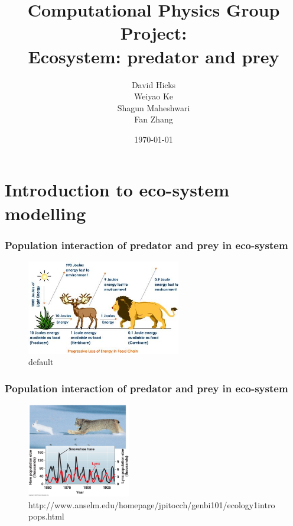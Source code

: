 \documentclass{beamer}
\title{Computational Physics Group Project: \\ Ecosystem: predator and prey}
\author{David Hicks\\ Weiyao Ke \\ Shagun Maheshwari \\ Fan Zhang}
\date{\today}
\begin{document}
\frame{\titlepage}

\section[Outline]{}
\frame{\tableofcontents}

\section{Introduction to eco-system modelling}

\frame
{
	\frametitle{Population interaction of predator and prey in eco-system}

	\begin{figure}[htbp]
	\begin{center}
	\includegraphics[width=0.6\textwidth]{./pics/progressive-energy-loss.jpeg}
	\caption{default}
	\label{default}
	\end{center}
	\end{figure}
}


\frame
{
 	\frametitle{Population interaction of predator and prey in eco-system}
 
	\begin{figure}[htbp]
	\begin{center}
		\includegraphics[width=0.4\textwidth]{./pics/predator_prey2.jpeg}
	\caption{http://www.anselm.edu/homepage/jpitocch/genbi101/ecology1intropops.html}
	\label{default}
	\end{center}
	\end{figure}  
}
\end{document}
